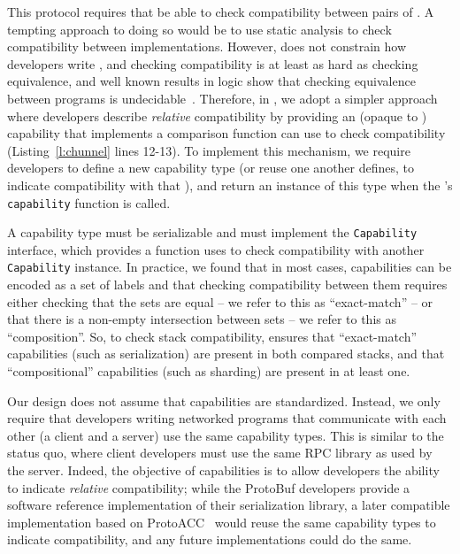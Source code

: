  This protocol requires that \name be able to check compatibility between pairs of \tunnels. A tempting approach to doing so would be to use static analysis to check compatibility between \tunnel implementations. However, \name does not constrain how developers write \tunnels, and checking compatibility is at least as hard as checking equivalence, and well known results in logic show that checking equivalence between programs is undecidable~\cite{sipser13}. 
Therefore, in \name, we adopt a simpler approach where \tunnel developers describe \emph{relative} compatibility by providing an (opaque to \name) capability that implements a comparison function \name can use to check compatibility (Listing~\ref{l:chunnel} lines 12-13). To implement this mechanism, we require \tunnel developers to define a new capability type (or reuse one another \tunnel defines, to indicate compatibility with that \tunnel), and return an instance of this type when the \tunnel's \texttt{capability} function is called. 

A capability type must be serializable and must implement the \texttt{Capability} interface, which provides a function \name uses to check compatibility with another \texttt{Capability} instance. 
In practice, we found that in most cases, \tunnel capabilities can be encoded as a set of labels and that checking compatibility between them requires either checking that the sets are equal -- we refer to this as ``exact-match'' -- or that there is a non-empty intersection between sets -- we refer to this as ``composition''.
So, to check \tunnel stack compatibility, \name ensures that ``exact-match'' capabilities (such as serialization) are present in both compared stacks, and that ``compositional'' capabilities (such as sharding) are present in at least one.

Our design does not assume that capabilities are standardized. Instead, we only require that developers writing networked programs that communicate with each other (\eg a client and a server) use the same capability types. 
This is similar to the status quo, where client developers must use the same RPC library as used by the server. Indeed, the objective of \name capabilities is to allow \tunnel developers the ability to indicate \emph{relative} compatibility; while the ProtoBuf developers provide a software reference implementation of their serialization library, a later compatible implementation based on ProtoACC~\cite{protoacc} would reuse the same capability types to indicate compatibility, and any future implementations could do the same.

